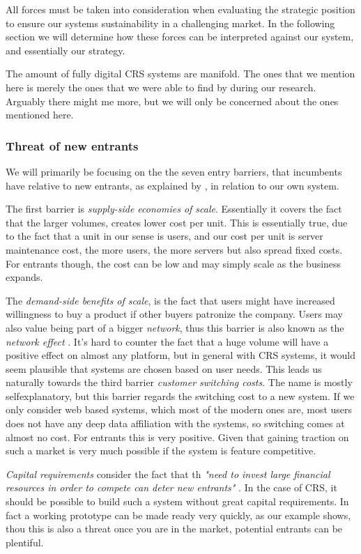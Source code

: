 All forces must be taken into consideration when evaluating the strategic position to ensure our systems sustainability in a challenging market. 
In the following section we will determine how these forces can be interpreted against our system, and essentially our strategy.

The amount of fully digital CRS systems are manifold. The ones that we mention here is merely the ones that we were able to find by during our research. Arguably there might me more, but we will only be concerned about the ones mentioned here. 


\subsubsection{Threat of new entrants}
We will primarily be focusing on the the seven entry barriers, that incumbents have relative to new entrants, as explained by , in relation to our own system.


The first barrier is \emph{supply-side economies of scale}. Essentially it covers the fact that the larger volumes, creates lower cost per unit. This is essentially true, due to the fact that a unit in our sense is users, and our cost per unit is server maintenance cost, the more users, the more servers but also spread fixed costs. For entrants though, the cost can be low and may simply scale as the business expands.

The \emph{demand-side benefits of scale}, is the fact that users might have increased willingness to buy a product if other buyers patronize the company. Users may also value being part of a bigger \emph{network}, thus this barrier is also known as the \emph{network effect} \cite[p.~81]{porter2008five}. It's hard to counter the fact that a huge volume will have a positive effect on almost any platform, but in general with CRS systems, it would seem plausible that systems are chosen based on user needs. This leads us naturally towards the third barrier \emph{customer switching costs}. The name is mostly selfexplanatory, but this barrier regards the switching cost to a new system. If we only consider web based systems, which most of the modern ones are, most users does not have any deep data affiliation with the systems, so switching comes at almost no cost. For entrants this is very positive. Given that gaining traction on such a market is very much possible if the system is feature competitive.

\emph{Capital requirements} consider the fact that th \emph{"need to invest large financial resources in order to compete can deter new entrants"} \cite[p.~81]{porter2008five}. In the case of CRS, it should be possible to build such a system without great capital requirements. In fact a working prototype can be made ready very quickly, as our example shows, thou this is also a threat once you are in the market, potential entrants can be plentiful.

